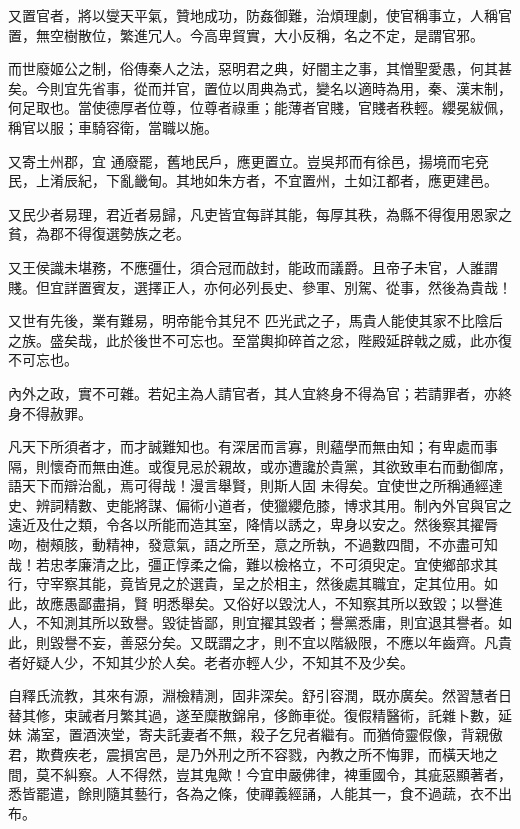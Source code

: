 \begin{pinyinscope}
 又置官者，將以燮天平氣，贊地成功，防姦御難，治煩理劇，使官稱事立，人稱官置，無空樹散位，繁進冗人。今高卑貿實，大小反稱，名之不定，是謂官邪。



 而世廢姬公之制，俗傳秦人之法，惡明君之典，好闇主之事，其憎聖愛愚，何其甚矣。今則宜先省事，從而并官，置位以周典為式，變名以適時為用，秦、漢末制，何足取也。當使德厚者位尊，位尊者祿重；能薄者官賤，官賤者秩輕。纓冕紱佩，稱官以服；車騎容衛，當職以施。



 又寄土州郡，宜
 通廢罷，舊地民戶，應更置立。豈吳邦而有徐邑，揚境而宅兗民，上淆辰紀，下亂畿甸。其地如朱方者，不宜置州，土如江都者，應更建邑。



 又民少者易理，君近者易歸，凡吏皆宜每詳其能，每厚其秩，為縣不得復用恩家之貧，為郡不得復選勢族之老。



 又王侯識未堪務，不應彊仕，須合冠而啟封，能政而議爵。且帝子未官，人誰謂賤。但宜詳置賓友，選擇正人，亦何必列長史、參軍、別駕、從事，然後為貴哉！



 又世有先後，業有難易，明帝能令其兒不
 匹光武之子，馬貴人能使其家不比陰后之族。盛矣哉，此於後世不可忘也。至當輿抑碎首之忿，陛殿延辟戟之威，此亦復不可忘也。



 內外之政，實不可雜。若妃主為人請官者，其人宜終身不得為官；若請罪者，亦終身不得赦罪。



 凡天下所須者才，而才誠難知也。有深居而言寡，則蘊學而無由知；有卑處而事隔，則懷奇而無由進。或復見忌於親故，或亦遭讒於貴黨，其欲致車右而動御席，語天下而辯治亂，焉可得哉！漫言舉賢，則斯人固
 未得矣。宜使世之所稱通經達史、辨詞精數、吏能將謀、偏術小道者，使獵纓危膝，博求其用。制內外官與官之遠近及仕之類，令各以所能而造其室，降情以誘之，卑身以安之。然後察其擢脣吻，樹頰胲，動精神，發意氣，語之所至，意之所執，不過數四間，不亦盡可知哉！若忠孝廉清之比，彊正惇柔之倫，難以檢格立，不可須臾定。宜使鄉部求其行，守宰察其能，竟皆見之於選貴，呈之於相主，然後處其職宜，定其位用。如此，故應愚鄙盡捐，賢
 明悉舉矣。又俗好以毀沈人，不知察其所以致毀；以譽進人，不知測其所以致譽。毀徒皆鄙，則宜擢其毀者；譽黨悉庸，則宜退其譽者。如此，則毀譽不妄，善惡分矣。又既謂之才，則不宜以階級限，不應以年齒齊。凡貴者好疑人少，不知其少於人矣。老者亦輕人少，不知其不及少矣。



 自釋氏流教，其來有源，淵檢精測，固非深矣。舒引容潤，既亦廣矣。然習慧者日替其修，束誡者月繁其過，遂至糜散錦帛，侈飾車從。復假精醫術，託雜卜數，延妹
 滿室，置酒浹堂，寄夫託妻者不無，殺子乞兒者繼有。而猶倚靈假像，背親傲君，欺費疾老，震損宮邑，是乃外刑之所不容戮，內教之所不悔罪，而橫天地之間，莫不糾察。人不得然，豈其鬼歟！今宜申嚴佛律，裨重國令，其疵惡顯著者，悉皆罷遣，餘則隨其藝行，各為之條，使禪義經誦，人能其一，食不過蔬，衣不出布。




\end{pinyinscope}
